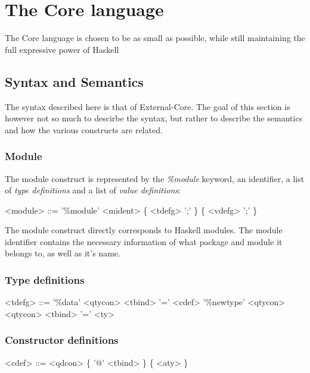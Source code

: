 
\chapter{The Core language}

The Core language is chosen to be as small as possible, while still maintaining 
the full expressive power of Haskell

\section*{Syntax and Semantics}

The syntax described here is that of External-Core. The goal of this section is
however not so much to descirbe the syntax, but rather to describe the semantics and 
how the various constructs are related.

\subsection*{Module}

The module construct is represented by the \emph{\%module} keyword, an identifier,
a list of \emph{type definitions} and a list of \emph{value definitions}:

\begin{grammar}
<module> ::= '\%module' <mident> \{ <tdefg> ';' \} \{ <vdefg> ';' \}
\end{grammar}

The module construct directly corresponds to Haskell modules. The module identifier
contains the necessary information of what package and module it belongs to, as
well as it's name.

\subsection*{Type definitions}

\begin{grammar}
 <tdefg> ::= '\%data' <qtycon> <tbind> '=' <cdef>
        \alt '\%newtype' <qtycon> <qtycon> <tbind> '=' <ty>
\end{grammar}


\subsection*{Constructor definitions}

\begin{grammar}
 <cdef> ::= <qdcon> \{ '@' <tbind> \} \{ <aty> \}
\end{grammar}

